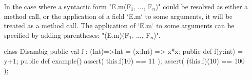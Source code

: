 In the case where a syntactic form \xcdmath"E.m(F$_1$, $\ldots$, F$_n$)" could
be resolved as either a method call, or the application of a field \xcd`E.m`
to some arguments, it will be treated as a method call.  
The application of \xcd`E.m` to some arguments can be specified by adding
parentheses:  \xcdmath"(E.m)(F$_1$, $\ldots$, F$_n$)".

\begin{ex}

\begin{xten}
class Disambig {
  public val f : (Int)=>Int =  (x:Int) => x*x;
  public def f(y:int) = y+1;
  public def example() {
      assert(  this.f(10)  == 11  );
      assert( (this.f)(10) == 100 );
  }
}
\end{xten}
%

\end{ex}
